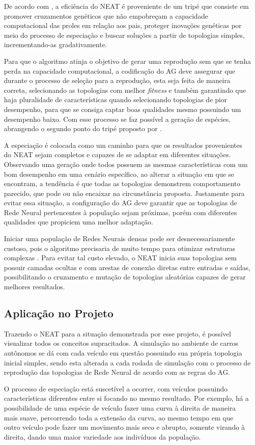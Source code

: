 De acordo com , a eficiência do NEAT é proveniente de um 
tripé que consiste em promover cruzamentos genéticos que não empobreçam a 
capacidade computacional das proles em relação aos pais, proteger inovações 
genéticas por meio do processo de especiação e buscar soluções a partir de 
topologias simples, incrementando-as gradativamente. 

Para que o algoritmo atinja o objetivo de gerar uma reprodução sem que se 
tenha perda na capacidade computacional, a codificação do AG deve assegurar que 
durante o processo de seleção para a reprodução, esta seja feita de maneira correta, 
selecionando as topologias com melhor \textit{fitness} e também garantindo que haja 
pluralidade de características quando selecionando topologias de pior desempenho, 
para que se consiga captar boas qualidades mesmo possuindo um desempenho baixo. Com 
esse processo se faz possível a geração de espécies, abrangendo o 
segundo ponto do tripé proposto por .

A especiação é colocada como um caminho para que os resultados provenientes 
do NEAT sejam completos e capazes de se adaptar em diferentes situações. Observando 
uma geração onde todos possuem as mesmas características com um 
bom desempenho em uma cenário específico, ao alterar a situação em que se 
encontram, a tendência é que todas as topologias demonstrem comportamento 
parecido, que pode ou não encaixar na circunstância proposta. Justamente para evitar essa 
situação, a configuração do AG deve garantir que as topologias de Rede Neural 
pertencentes à população sejam próximas, porém com diferentes qualidades que 
propiciem uma melhor adaptação.

Iniciar uma população de Redes Neurais densas pode ser 
desnecessariamente custoso, pois o algoritmo precisaria de muito tempo para 
otimizar estruturas complexas \cite{stanley2002}. Para evitar tal 
custo elevado, o NEAT inicia suas topologias sem possuir camadas ocultas e com 
arestas de conexão diretas entre entradas e saídas, possibilitando o cruzamento e mutação de 
topologias aleatórias capazes de gerar melhores resultados.

\subsection{Aplica{\c c}{\~a}o no Projeto}

Trazendo o NEAT para a situação demonstrada por esse projeto, é possível 
visualizar todos os conceitos supracitados. A simulação no ambiente de carros 
autônomos se dá com cada veículo em questão possuindo sua própria topologia 
inicial simples, sendo esta alterada a cada rodada de simulação com o processo 
de reprodução das topologias de Rede Neural de acordo com as regras do AG. 

O processo de especiação está suscetível a ocorrer, com veículos possuindo 
características diferentes entre si focando no mesmo resultado. Por exemplo, há a 
possibilidade de uma espécie de veículo fazer uma curva à direita de maneira mais 
suave, percorrendo toda a extensão da curva, ao mesmo tempo em que outro 
veículo pode fazer um movimento mais seco e abrupto, somente virando à direita, 
dando uma maior variedade aos indivíduos da população.
